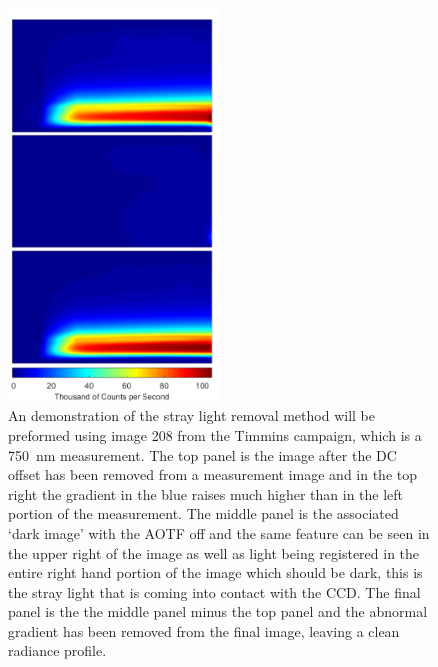 \begin{figure}
    \includegraphics[width=0.5\textwidth]{./Images/5-2-StrayLightComparison.pdf}
    \caption[Example Stray Light Removal]{An demonstration of the stray light removal method will be preformed using image 208 from the Timmins campaign, which is a 750~nm measurement. The top panel is the image after the DC offset has been removed from a measurement image and in the top right the gradient in the blue raises much higher than in the left portion of the measurement. The middle panel is the associated `dark image' with the AOTF off and the same feature can be seen in the upper right of the image as well as light being registered in the entire right hand portion of the image which should be dark, this is the stray light that is coming into contact with the CCD. The final panel is the the middle panel minus the top panel and the abnormal gradient has been removed from the final image, leaving a clean radiance profile.}
    \label{fig:5.2:strayLightComparison}
\end{figure}

